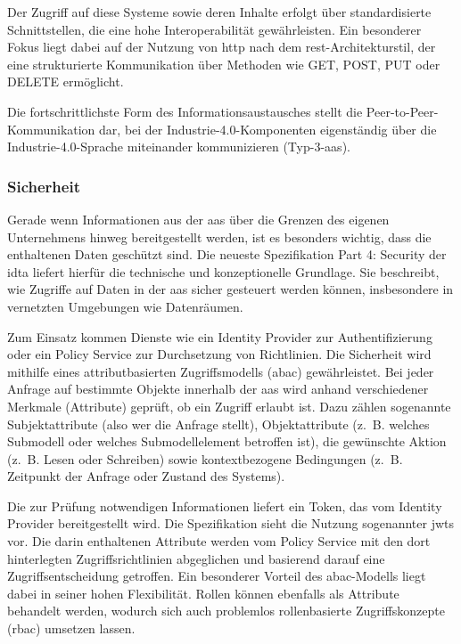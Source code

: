 Der Zugriff auf diese Systeme sowie deren Inhalte erfolgt über standardisierte Schnittstellen, die eine hohe Interoperabilität gewährleisten. 
Ein besonderer Fokus liegt dabei auf der Nutzung von \ac{http} nach dem \ac{rest}-Architekturstil, der eine strukturierte Kommunikation über Methoden wie GET, POST, PUT oder DELETE ermöglicht.

Die fortschrittlichste Form des Informationsaustausches stellt die Peer-to-Peer-Kommuni\-kation dar, bei der Industrie-4.0-Komponenten eigenständig über die Industrie-4.0-Sprache \cite{I4Sprache} miteinander kommunizieren (Typ-3-\acs{aas}).

\subsubsection{Sicherheit}
\label{sec: Sicherheit}
Gerade wenn Informationen aus der \acs{aas} über die Grenzen des eigenen Unternehmens hinweg bereitgestellt werden, ist es besonders wichtig, dass die enthaltenen Daten geschützt sind. 
Die neueste Spezifikation Part 4: Security \cite{SpezifikationPart4} der \acs{idta} liefert hierfür die technische und konzeptionelle Grundlage.
Sie beschreibt, wie Zugriffe auf Daten in der \acs{aas} sicher gesteuert werden können, insbesondere in vernetzten Umgebungen wie Datenräumen.

Zum Einsatz kommen Dienste wie ein Identity Provider zur Authentifizierung oder ein Policy Service zur Durchsetzung von Richtlinien.
Die Sicherheit wird mithilfe eines attributbasierten Zugriffsmodells (\ac{abac}) gewährleistet.
Bei jeder Anfrage auf bestimmte Objekte innerhalb der \acs{aas} wird anhand verschiedener Merkmale (Attribute) geprüft, ob ein Zugriff erlaubt ist.
Dazu zählen sogenannte Subjekt\-attribute (also wer die Anfrage stellt), Objektattribute (z.~B. welches Submodell oder welches Submodellelement betroffen ist), die gewünschte Aktion (z.~B. Lesen oder Schreiben) sowie kontextbezogene Bedingungen (z.~B. Zeitpunkt der Anfrage oder Zustand des Systems).

Die zur Prüfung notwendigen Informationen liefert ein Token, das vom Identity Provider bereitgestellt wird. 
Die Spezifikation sieht die Nutzung sogenannter \acp{jwt} vor.
Die darin enthaltenen Attribute werden vom Policy Service mit den dort hinterlegten Zugriffsrichtlinien abgeglichen und basierend darauf eine Zugriffsentscheidung getroffen.
Ein besonderer Vorteil des \acs{abac}-Modells liegt dabei in seiner hohen Flexibilität. 
Rollen können ebenfalls als Attribute behandelt werden, wodurch sich auch problemlos rollenbasierte Zugriffskonzepte (\ac{rbac}) umsetzen lassen. 

